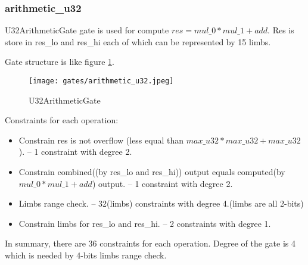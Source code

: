 \subsubsection{arithmetic\_u32}

U32ArithmeticGate gate is used for compute $res = mul\_0 * mul\_1 + add$. Res is store in res\_lo and res\_hi each of which 
can be represented by 15 limbs.

Gate structure is like figure \ref{fig:arithmetic-u32}.

\begin{figure}[!ht]
    \centering
    \texttt{[image: gates/arithmetic\_u32.jpeg]}
    \caption{U32ArithmeticGate}
    \label{fig:arithmetic-u32}
\end{figure}

Constraints for each operation:
\begin{itemize}
    \item Constrain res is not overflow (less equal than $max\_u32 * max\_u32 + max\_u32$). -- 1 constraint with degree 2.
    \item Constrain combined((by res\_lo and res\_hi)) output equals computed(by $mul\_0 * mul\_1 + add$) output. -- 1 constraint with degree 2.
    \item Limbs range check. -- 32(limbs) constraints with degree 4.(limbs are all 2-bits)
    \item Constrain limbs for res\_lo and res\_hi. -- 2 constraints with degree 1.
\end{itemize}

In summary, there are 36 constraints for each operation. Degree of the gate is 4 which is needed by 4-bits limbs range check.